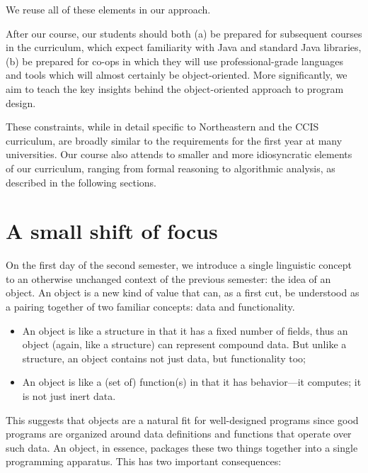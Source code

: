 \documentclass[submission,copyright]{eptcs}
\begin{document}
\noindent
We reuse all of these elements in our approach.

After our course, our students should both (a) be prepared for
subsequent courses in the curriculum, which expect familiarity with
Java and standard Java libraries, (b) be prepared for co-ops in which
they will use professional-grade languages and tools which will
almost certainly be object-oriented.  More significantly, we aim to
teach the key insights behind the object-oriented approach to program
design.

These constraints, while in detail specific to Northeastern and the
CCIS curriculum, are broadly similar to the requirements for the first
year at many universities.  Our course also attends to smaller and
more idiosyncratic elements of our curriculum, ranging from formal
reasoning to algorithmic analysis, as described in the following
sections.



\section{A small shift of focus}
\label{sec:shift}

On the first day of the second semester, we introduce a single
linguistic concept to an otherwise unchanged context of the previous
semester: the idea of an object.
%
An object is a new kind of value that can, as a first cut, be
understood as a pairing together of two familiar concepts: data and
functionality.

\begin{itemize}
\item An object is like a structure in that it has a fixed number of
fields, thus an object (again, like a structure) can represent
compound data. But unlike a structure, an object contains not just
data, but functionality too;

\item An object is like a (set of) function(s) in that it has behavior---it computes; it is
not just inert data.
\end{itemize}

This suggests that objects are a natural fit for well-designed programs
since good programs are organized around data definitions and
functions that operate over such data. An object, in essence, packages
these two things together into a single programming apparatus. This
has two important consequences:
\end{document}
